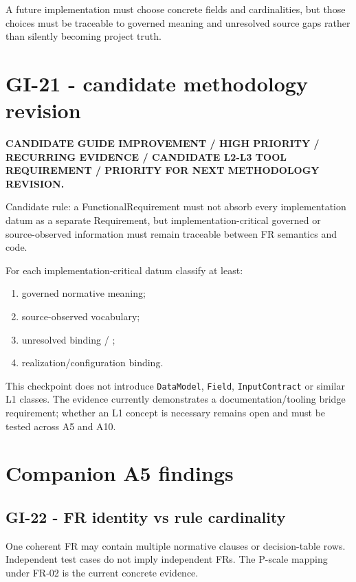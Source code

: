 \documentclass[11pt,a4paper]{article}
\begin{document}
\begin{ddtaopen}[title={FR-03 information-contract gap}]
A future implementation must choose concrete fields and cardinalities, but those choices must be traceable to governed meaning and unresolved source gaps rather than silently becoming project truth.
\end{ddtaopen}

\section{GI-21 - candidate methodology revision}
\begin{ddtacore}[title={GI-21 status}]
\textbf{CANDIDATE GUIDE IMPROVEMENT / HIGH PRIORITY / RECURRING EVIDENCE / CANDIDATE L2-L3 TOOL REQUIREMENT / PRIORITY FOR NEXT METHODOLOGY REVISION.}
\end{ddtacore}

Candidate rule: a FunctionalRequirement must not absorb every implementation datum as a separate Requirement, but implementation-critical governed or source-observed information must remain traceable between FR semantics and code.

For each implementation-critical datum classify at least:
\begin{enumerate}
\item governed normative meaning;
\item source-observed vocabulary;
\item unresolved binding / \NS;
\item realization/configuration binding.
\end{enumerate}

\begin{ddtaanti}[title={Premature L1 change}]
This checkpoint does not introduce \texttt{DataModel}, \texttt{Field}, \texttt{InputContract} or similar L1 classes. The evidence currently demonstrates a documentation/tooling bridge requirement; whether an L1 concept is necessary remains open and must be tested across A5 and A10.
\end{ddtaanti}

\section{Companion A5 findings}
\subsection{GI-22 - FR identity vs rule cardinality}
One coherent FR may contain multiple normative clauses or decision-table rows. Independent test cases do not imply independent FRs. The P-scale mapping under FR-02 is the current concrete evidence.
\end{document}
